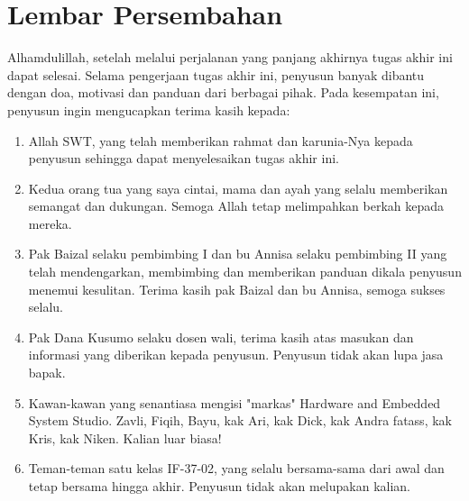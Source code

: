\chapter*{Lembar Persembahan}

Alhamdulillah, setelah melalui perjalanan yang panjang akhirnya tugas akhir ini dapat selesai. Selama
pengerjaan tugas akhir ini, penyusun banyak dibantu dengan doa, motivasi dan panduan dari berbagai
pihak. Pada kesempatan ini, penyusun ingin mengucapkan terima kasih kepada:

\begin{enumerate}
	\item Allah SWT, yang telah memberikan rahmat dan karunia-Nya kepada penyusun sehingga dapat 
	menyelesaikan tugas akhir ini. 
	\item Kedua orang tua yang saya cintai, mama dan ayah yang selalu memberikan semangat dan dukungan.
	Semoga Allah tetap melimpahkan berkah kepada mereka. 
	\item Pak Baizal selaku pembimbing I dan bu Annisa selaku pembimbing II yang telah mendengarkan, 
	membimbing dan memberikan panduan dikala penyusun menemui kesulitan. Terima kasih pak Baizal dan
	bu Annisa, semoga sukses selalu.
	\item Pak Dana Kusumo selaku dosen wali, terima kasih atas masukan dan informasi yang diberikan kepada penyusun.
	Penyusun tidak akan lupa jasa bapak.
	\item Kawan-kawan yang senantiasa mengisi "markas" Hardware and Embedded System Studio. Zavli, Fiqih, Bayu, 
	kak Ari, kak Dick, kak Andra fatass, kak Kris, kak Niken. Kalian luar biasa!
	\item Teman-teman satu kelas IF-37-02, yang selalu bersama-sama dari awal dan tetap bersama hingga akhir.
	Penyusun tidak akan melupakan kalian.
\end{enumerate}
